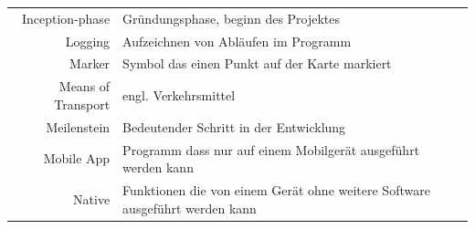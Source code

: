 \documentclass[a4paper,10pt,xetex]{article}
\begin{document}
\begin{longtable}[]{@{}rl@{}}
\begin{minipage}[t]{0.18\columnwidth}
Inception-phase\strut
\end{minipage} & \begin{minipage}[t]{0.76\columnwidth}\raggedright\strut
Gründungsphase, beginn des Projektes\strut
\end{minipage}\tabularnewline
\begin{minipage}[t]{0.18\columnwidth}\raggedleft\strut
Logging\strut
\end{minipage} & \begin{minipage}[t]{0.76\columnwidth}\raggedright\strut
Aufzeichnen von Abläufen im Programm\strut
\end{minipage}\tabularnewline
\begin{minipage}[t]{0.18\columnwidth}\raggedleft\strut
Marker\strut
\end{minipage} & \begin{minipage}[t]{0.76\columnwidth}\raggedright\strut
Symbol das einen Punkt auf der Karte markiert\strut
\end{minipage}\tabularnewline
\begin{minipage}[t]{0.18\columnwidth}\raggedleft\strut
Means of Transport\strut
\end{minipage} & \begin{minipage}[t]{0.76\columnwidth}\raggedright\strut
engl. Verkehrsmittel\strut
\end{minipage}\tabularnewline
\begin{minipage}[t]{0.18\columnwidth}\raggedleft\strut
Meilenstein\strut
\end{minipage} & \begin{minipage}[t]{0.76\columnwidth}\raggedright\strut
Bedeutender Schritt in der Entwicklung\strut
\end{minipage}\tabularnewline
\begin{minipage}[t]{0.18\columnwidth}\raggedleft\strut
Mobile App\strut
\end{minipage} & \begin{minipage}[t]{0.76\columnwidth}\raggedright\strut
Programm dass nur auf einem Mobilgerät ausgeführt werden kann\strut
\end{minipage}\tabularnewline
\begin{minipage}[t]{0.18\columnwidth}\raggedleft\strut
Native\strut
\end{minipage} & \begin{minipage}[t]{0.76\columnwidth}\raggedright\strut
Funktionen die von einem Gerät ohne weitere Software ausgeführt werden
kann\strut
\end{minipage}\tabularnewline

\end{longtable}
\end{document}
